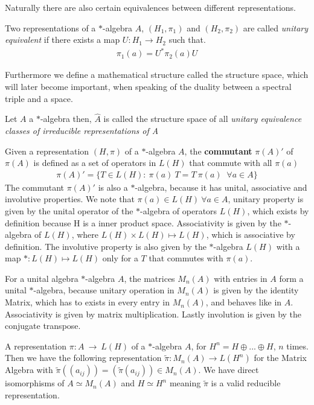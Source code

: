 Naturally there are also certain equivalences between different
representations.
\begin{definition}
Two representations of a $*$-algebra $A$, $(H_1, \pi _1)$ and
$(H_2, \pi _2)$  are called \textit{unitary equivalent} if there exists a map
$U: H_1 \rightarrow H_2$ such that.
    \begin{align}
        \pi _1(a) = U^* \pi _2(a) U
    \end{align}
\end{definition}

Furthermore we define a mathematical structure called the structure space,
which will later become important, when speaking of the duality between a spectral
triple and a space.
\begin{definition}
    Let $A$ a $*$-algebra then, $\hat{A}$ is called the structure space of all \textit{unitary equivalence classes
    of irreducible representations of A}
\end{definition}
    Given a representation $(H, \pi)$ of a $*$-algebra $A$, the \textbf{commutant} $\pi (A)'$ of $\pi (A)$ is defined as a set
    of operators in $L(H)$ that commute with all $\pi (a)$
    \begin{align}
        \pi (A)' = \big\{T \in L(H):\ \pi(a)\ T = T\ \pi(a) \;\; \forall a\in
        A\big\}
    \end{align}
    The commutant $\pi (A)'$ is also a $*$-algebra, because it has unital,
    associative and involutive properties.
    We note that $\pi (a) \in L(H)\ \forall a \in A$, unitary property is given
    by the unital operator of the $*$-algebra of operators $L(H)$, which exists
    by definition because H is a inner product space. Associativity is given by
    the $*$-algebra of $L(H)$, where $L(H) \times L(H) \mapsto L(H)$, which is
    associative by definition. The involutive property is also given by the $*$-algebra $L(H)$
    with a map $*: L(H) \mapsto L(H)$ only for a $T$ that commutes with $\pi (a)$.

    For a unital algebra $*$-algebra $A$, the matrices $M_n(A)$ with entries
    in $A$ form a unital $*$-algebra, because unitary operation in $M_n(A)$ is given by the identity Matrix, which
    has to exists in every entry in $M_n(A)$, and behaves like in $A$. Associativity is given by
    matrix multiplication. Lastly involution is given by the conjugate transpose.

    A representation $\pi :A\ \rightarrow \ L(H)$ of a $*$-algebra $A$, for
    $H^n = H \oplus ... \oplus H$, $n$ times.  Then we have the following
    representation $\tilde{\pi}:M_n(A) \rightarrow L(H^n)$ for the Matrix
    Algebra with $\tilde{\pi}((a_{ij})) = (\tilde{\pi}(a_{ij})) \in M_n(A)$.
    We have direct isomorphisms of $A \simeq M_n(A)$ and $H \simeq H^n$
    meaning $\tilde{\pi}$ is a valid reducible representation.

